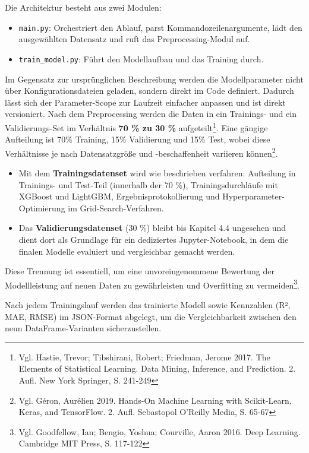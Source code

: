 Die Architektur besteht aus zwei Modulen:

\begin{itemize}
  \item \texttt{main.py}: Orchestriert den Ablauf, parst Kommandozeilenargumente, lädt den ausgewählten Datensatz und ruft das Preprocessing-Modul auf.
  \item \texttt{train\_model.py}: Führt den Modellaufbau und das Training durch.
\end{itemize}

Im Gegensatz zur ursprünglichen Beschreibung werden die Modellparameter nicht über Konfigurationsdateien geladen, sondern direkt im Code definiert. Dadurch lässt sich der Parameter-Scope zur Laufzeit einfacher anpassen und ist direkt versioniert. Nach dem Preprocessing werden die Daten in ein Trainings- und ein Validierungs-Set im Verhältnis \textbf{70 \% zu 30 \%} aufgeteilt\footnote{Vgl. Hastie, Trevor; Tibshirani, Robert; Friedman, Jerome 2017. The Elements of Statistical Learning. Data Mining, Inference, and Prediction. 2. Aufl. New York Springer, S. 241-249}. Eine gängige Aufteilung ist 70\% Training, 15\% Validierung und 15\% Test, wobei diese Verhältnisse je nach Datensatzgröße und -beschaffenheit variieren können\footnote{Vgl. Géron, Aurélien 2019. Hands-On Machine Learning with Scikit-Learn, Keras, and TensorFlow. 2. Aufl. Sebastopol O'Reilly Media, S. 65-67}.

\begin{itemize}
  \item Mit dem \textbf{Trainingsdatenset} wird wie beschrieben verfahren: Aufteilung in Trainings- und Test-Teil (innerhalb der 70 \%), Trainingsdurchläufe mit XGBoost und LightGBM, Ergebnisprotokollierung und Hyperparameter-Optimierung im Grid-Search-Verfahren.
  \item Das \textbf{Validierungsdatenset} (30 \%) bleibt bis Kapitel 4.4 ungesehen und dient dort als Grundlage für ein dediziertes Jupyter-Notebook, in dem die finalen Modelle evaluiert und vergleichbar gemacht werden.
\end{itemize}

Diese Trennung ist essentiell, um eine unvoreingenommene Bewertung der Modellleistung auf neuen Daten zu gewährleisten und Overfitting zu vermeiden\footnote{Vgl. Goodfellow, Ian; Bengio, Yoshua; Courville, Aaron 2016. Deep Learning. Cambridge MIT Press, S. 117-122}.

Nach jedem Trainingslauf werden das trainierte Modell sowie Kennzahlen (R², MAE, RMSE) im JSON-Format abgelegt, um die Vergleichbarkeit zwischen den neun DataFrame-Varianten sicherzustellen.

